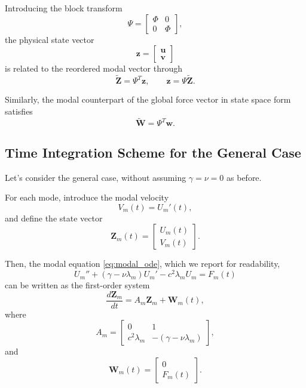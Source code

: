 \documentclass{Configuration_Files/PoliMi3i_thesis}
\begin{document}
Introducing the block transform
\begin{equation*}
\Psi
=
\begin{bmatrix}
\Phi&0\\
0&\Phi
\end{bmatrix},
\end{equation*}
the physical state vector
\begin{equation*}
\mathbf z
=
\begin{bmatrix}
\mathbf u\\
\mathbf v
\end{bmatrix}
\end{equation*}
is related to the reordered modal vector through
\begin{equation*}
\widetilde{\mathbf Z}
=
\Psi^T\mathbf z,
\qquad
\mathbf z
=
\Psi\widetilde{\mathbf Z}.
\end{equation*}

Similarly, the modal counterpart of the global force vector in state space form satisfies
\begin{equation*}
\widetilde{\mathbf W}
=
\Psi^T\mathbf w.
\end{equation*}

\subsection{Time Integration Scheme for the General Case}
\label{sec:pstd_general_damping}
Let's consider the general case, without assuming $\gamma=\nu=0$ as before.

For each mode, introduce the modal velocity
\begin{equation*}
V_m(t)=U_m'(t),
\end{equation*}
and define the state vector
\begin{equation*} 
\mathbf Z_m(t)
=
\begin{bmatrix}
U_m(t)\\
V_m(t)
\end{bmatrix}.
\end{equation*}

Then, the modal equation \eqref{eq:modal_ode}, which we report for readability,
\begin{equation*}
U_m''
+
\left(
\gamma-\nu\lambda_m
\right)
U_m'
-
c^2\lambda_mU_m
=
F_m(t)
\end{equation*}
can be written as the first-order system
\begin{equation*} 
\frac{d\mathbf Z_m}{dt}
=
A_m\mathbf Z_m
+
\mathbf W_m(t),
\end{equation*}
where
\begin{equation*} 
    A_m
    =
    \begin{bmatrix}
    0 & 1\\
    c^2\lambda_m & -(\gamma-\nu\lambda_m)
    \end{bmatrix},
\end{equation*}
and
\begin{equation*}
    \mathbf W_m(t)
    =
    \begin{bmatrix}
    0\\
    F_m(t)
    \end{bmatrix}.
\end{equation*}
\end{document}

